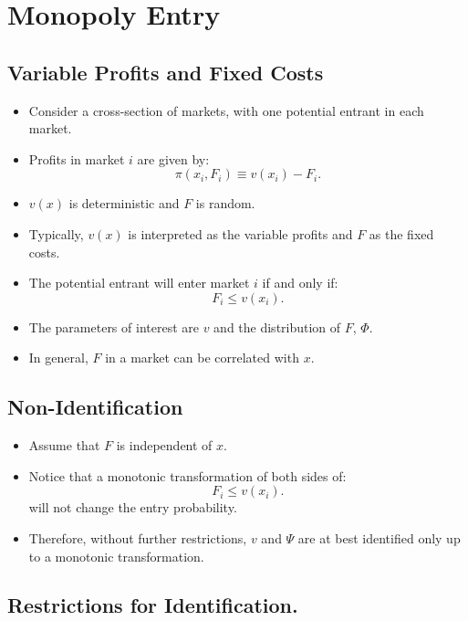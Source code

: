 \documentclass[
]{book}
\providecommand{\tightlist}{%
  \setlength{\itemsep}{0pt}\setlength{\parskip}{0pt}}
\begin{document}
\hypertarget{monopoly-entry}{%
\section{Monopoly Entry}\label{monopoly-entry}}

\hypertarget{variable-profits-and-fixed-costs}{%
\subsection{Variable Profits and Fixed Costs}\label{variable-profits-and-fixed-costs}}

\begin{itemize}
\item
  Consider a cross-section of markets, with one potential entrant in each market.
\item
  Profits in market \(i\) are given by:
  \[
  \pi(x_i, F_i) \equiv v(x_i) - F_i.
  \]
\item
  \(v(x)\) is deterministic and \(F\) is random.
\item
  Typically, \(v(x)\) is interpreted as the variable profits and \(F\) as the fixed costs.
\item
  The potential entrant will enter market \(i\) if and only if:
  \[
  F_i \le v(x_i).
  \]
\item
  The parameters of interest are \(v\) and the distribution of \(F\), \(\Phi\).
\item
  In general, \(F\) in a market can be correlated with \(x\).
\end{itemize}

\hypertarget{non-identification}{%
\subsection{Non-Identification}\label{non-identification}}

\begin{itemize}
\tightlist
\item
  Assume that \(F\) is independent of \(x\).
\item
  Notice that a monotonic transformation of both sides of:
  \[
  F_i \le v(x_i).
  \]
  will not change the entry probability.
\item
  Therefore, without further restrictions, \(v\) and \(\Psi\) are at best identified only up to a monotonic transformation.
\end{itemize}

\hypertarget{restrictions-for-identification.}{%
\subsection{Restrictions for Identification.}\label{restrictions-for-identification.}}
\end{document}

